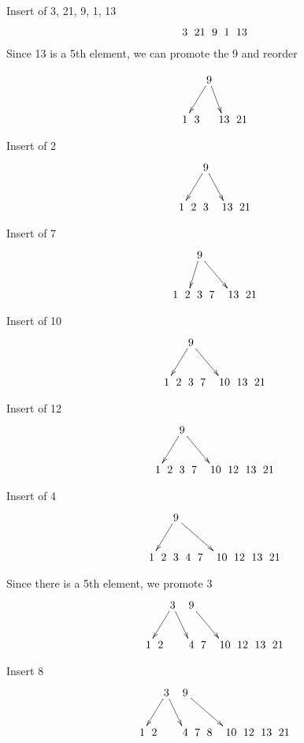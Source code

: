 \documentclass[a4paper]{article}
\begin{document}

Insert of 3, 21, 9, 1, 13
$$\xymatrix @C=0pt {
  &   &   &  3 &  21 &  9 &  1& 13 \\
}$$
Since 13 is a 5th element, we can promote the 9 and reorder

$$\xymatrix @C=0pt {
  &   &   &    &    &\ar[dll]  9 \ar[dr] &     &  \\
  &   &   &  1 &  3 &   &  13 & 21 \\
}$$

Insert of 2
$$\xymatrix @C=0pt {
  &   &   &    &    &\ar[dll]  9 \ar[drr] &     &  \\
  &   &   &  1 &  2 &  3 &   &  13 & 21 \\
}$$

Insert of 7
$$\xymatrix @C=0pt {
  &   &   &    &    &\ar[dllr]  9 \ar[drrr] &     &  \\
  &   &   &  1 &  2 &  3 &  7 &   &  13 & 21 \\
}$$

Insert of 10
$$\xymatrix @C=0pt {
  &   &   &    &    &\ar[dll]  9 \ar[drrr] &     &  \\
  &   &   &  1 &  2 &  3 &  7&   &10 &  13 & 21 \\
}$$

Insert of 12
$$\xymatrix @C=0pt {
  &   &   &    &    &\ar[dll]  9 \ar[drrr] &     &  \\
  &   &   &  1 &  2 &  3 &  7 &   &  10 &  12 &  13 &  21 \\
}$$

Insert of 4
$$\xymatrix @C=0pt {
  &   &   &    &    &\ar[dll]  9 \ar[drrrr] &     &  \\
  &   &   &  1 &  2 &  3 &  4 &  7 &   &  10 &  12 &  13 &  21 \\
}$$

Since there is a 5th element, we promote 3
$$\xymatrix @C=0pt {
  &   &    &   &    & \ar[dll] 3 \ar[drr]  &  &  9 \ar[drrr]   &  \\
  &   &   &  1 &  2  &  &  & 4 &  7 &   &  10 &  12 &  13 &  21 \\
}$$

Insert 8
$$\xymatrix @C=0pt {
  &   &    &   &    & \ar[dll] 3 \ar[drr]  &  &  9 \ar[drrrr]   &  \\
  &   &   &  1 &  2  &  &  & 4 &  7 &  8 &   &  10 &  12 &  13 &  21 \\
}$$
\end{document}
